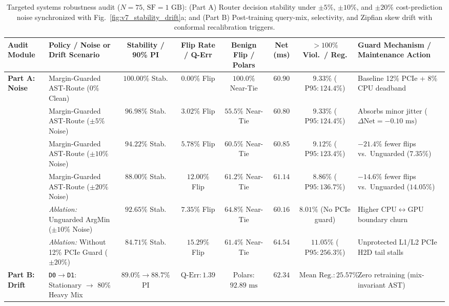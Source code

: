 \documentclass[10pt,a4paper]{article}
\newenvironment{fitasttable}{%
  \begin{lrbox}{\asttblbox}%
}{%
  \end{lrbox}%
  \sbox{\asttblboxB}{%
    \ifdim\wd\asttblbox>0.96\textwidth
      \resizebox{0.96\textwidth}{!}{\usebox{\asttblbox}}%
    \else
      \usebox{\asttblbox}%
    \fi
  }%
  \ifdim\ht\asttblboxB>0.78\textheight
    \resizebox{!}{0.78\textheight}{\usebox{\asttblboxB}}%
  \else
    \usebox{\asttblboxB}%
  \fi
}
\begin{document}
\begin{table}[!htbp]
\centering
\caption{Targeted systems robustness audit ($N=75$, $\text{SF}=1\text{ GB}$): (Part A) Router decision stability under $\pm 5\%$, $\pm 10\%$, and $\pm 20\%$ cost-prediction noise synchronized with Fig.~\ref{fig:v7_stability_drift}a; and (Part B) Post-training query-mix, selectivity, and Zipfian skew drift with conformal recalibration triggers.}\label{tab:v7_stability_drift}\label{tab:jbd_stability_t16}
\setlength{\tabcolsep}{2.8pt}
\scriptsize
\begin{fitasttable}
\begin{tabular}{@{}llcccccl@{}}
\toprule
\textbf{Audit Module} & \textbf{Policy / Noise or Drift Scenario} & \textbf{Stability / 90\% PI} & \textbf{Flip Rate / Q-Err} & \textbf{Benign Flip / Polars} & \textbf{Net (ms)} & \textbf{$>100\%$ Viol.\ / Reg.} & \textbf{Guard Mechanism / Maintenance Action} \\
\midrule
\multirow{6}{*}{\textbf{Part A: Noise}}
 & Margin-Guarded AST-Route ($0\%$ Clean) & $100.00\%$ Stab. & $0.00\%$ Flip & $100.0\%$ Near-Tie & $60.90$ & $9.33\%$ ($\text{P95}: 124.4\%$) & Baseline 12\% PCIe + 8\% CPU deadband \\
 & Margin-Guarded AST-Route ($\pm 5\%$ Noise) & $96.98\%$ Stab. & $3.02\%$ Flip & $55.5\%$ Near-Tie & $60.80$ & $9.33\%$ ($\text{P95}: 124.4\%$) & Absorbs minor jitter ($\Delta\text{Net} = -0.10\text{ ms}$) \\
 & Margin-Guarded AST-Route ($\pm 10\%$ Noise) & $\mathbf{94.22\%}$ Stab. & $\mathbf{5.78\%}$ Flip & $60.5\%$ Near-Tie & $60.85$ & $9.12\%$ ($\text{P95}: 123.4\%$) & $\mathbf{-21.4\%}$ fewer flips vs.\ Unguarded ($7.35\%$) \\
 & Margin-Guarded AST-Route ($\pm 20\%$ Noise) & $\mathbf{88.00\%}$ Stab. & $\mathbf{12.00\%}$ Flip & $61.2\%$ Near-Tie & $61.14$ & $\mathbf{8.86\%}$ ($\text{P95}: 136.7\%$) & $\mathbf{-14.6\%}$ fewer flips vs.\ Unguarded ($14.05\%$) \\
 & \emph{Ablation:} Unguarded ArgMin ($\pm 10\%$ Noise) & $92.65\%$ Stab. & $7.35\%$ Flip & $64.8\%$ Near-Tie & $60.16$ & $8.01\%$ (No PCIe guard) & Higher CPU$\leftrightarrow$GPU boundary churn \\
 & \emph{Ablation:} Without 12\% PCIe Guard ($\pm 20\%$) & $84.71\%$ Stab. & $15.29\%$ Flip & $61.4\%$ Near-Tie & $64.54$ & $11.05\%$ ($\text{P95}: 256.3\%$) & Unprotected L1/L2 PCIe H2D tail stalls \\
\midrule
\multirow{5}{*}{\textbf{Part B: Drift}}
 & \texttt{D0$\rightarrow$D1}: Stationary $\rightarrow$ $80\%$ Heavy Mix & $89.0\% \rightarrow 88.7\%$ PI & $\text{Q-Err}: 1.39$ & Polars: $92.89\text{ ms}$ & $\mathbf{62.34}$ & $\text{Mean Reg.}: 25.57\%$ & Zero retraining (mix-invariant AST) \\

\end{tabular}
\end{fitasttable}
\end{table}
\end{document}
